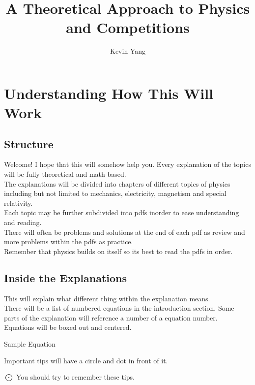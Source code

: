 \documentclass[titlepage]{article}
\title{A Theoretical Approach to Physics and Competitions}
\author{Kevin Yang}
\date{}
\begin{document}
\maketitle

\section{Understanding How This Will Work}
\subsection{Structure}
Welcome! I hope that this will somehow help you. Every explanation of the topics will be fully theoretical and math based. 
\\
The explanations will be divided into chapters of different topics of physics including but not limited to mechanics, electricity, magnetism and special relativity. 
\\
Each topic may be further subdivided into pdfs inorder to ease understanding and reading. 
\\
There will often be problems and solutions at the end of each pdf as review and more problems within the pdfs as practice.
\\
Remember that physics builds on itself so its best to read the pdfs in order.

\subsection{Inside the Explanations}
This will explain what different thing within the explanation means.
\\
There will be a list of numbered equations in the introduction section. Some parts of the explanation will reference a number of a equation number.
\\
Equations will be boxed out and centered.
\begin{center}
	\begin{framed}
		Sample Equation
	\end{framed}
\end{center}

Important tips will have a circle and dot in front of it.

\begin{center}
	$\bigodot$ You should try to remember these tips.
\end{center}
\end{document}
